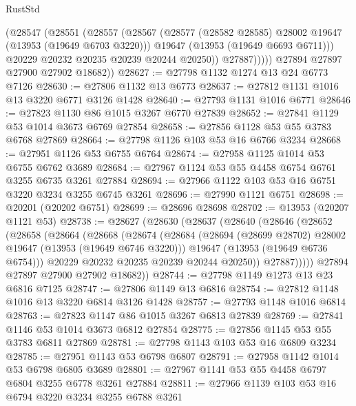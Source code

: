 \begin{lexlean}{RustStd}
\begin{coremodule}
                (@28547
                  (@28551
                    (@28557
                      (@28567
                        (@28577 (@28582 @28585) @28002 @19647 (@13953 (@19649 @6703 @3220)))
                        @19647
                        (@13953 (@19649 @6693 @6711)))
                      @20229
                      @20232
                      @20235
                      @20239
                      @20244
                      @20250))
                  @27887)))))
        @27894
        @27897
        @27900
        @27902
        @18682))
@28627 := @27798 @1132 @1274 @13 @24 @6773 @7126
@28630 := @27806 @1132 @13 @6773
@28637 := @27812 @1131 @1016 @13 @3220 @6771 @3126 @1428
@28640 := @27793 @1131 @1016 @6771
@28646 := @27823 @1130 @86 @1015 @3267 @6770 @27839
@28652 := @27841 @1129 @53 @1014 @3673 @6769 @27854
@28658 := @27856 @1128 @53 @55 @3783 @6768 @27869
@28664 := @27798 @1126 @103 @53 @16 @6766 @3234
@28668 := @27951 @1126 @53 @6755 @6764
@28674 := @27958 @1125 @1014 @53 @6755 @6762 @3689
@28684 := @27967 @1124 @53 @55 @4458 @6754 @6761 @3255 @6735 @3261 @27884
@28694 := @27966 @1122 @103 @53 @16 @6751 @3220 @3234 @3255 @6745 @3261
@28696 := @27990 @1121 @6751
@28698 := @20201 (@20202 @6751)
@28699 := @28696 @28698
@28702 := @13953 (@20207 @1121 @53)
@28738 := @28627
    (@28630
      (@28637
        (@28640
          (@28646
            (@28652
              (@28658
                (@28664
                  (@28668
                    (@28674
                      (@28684
                        (@28694 (@28699 @28702) @28002 @19647 (@13953 (@19649 @6746 @3220)))
                        @19647
                        (@13953 (@19649 @6736 @6754)))
                      @20229
                      @20232
                      @20235
                      @20239
                      @20244
                      @20250))
                  @27887)))))
        @27894
        @27897
        @27900
        @27902
        @18682))
@28744 := @27798 @1149 @1273 @13 @23 @6816 @7125
@28747 := @27806 @1149 @13 @6816
@28754 := @27812 @1148 @1016 @13 @3220 @6814 @3126 @1428
@28757 := @27793 @1148 @1016 @6814
@28763 := @27823 @1147 @86 @1015 @3267 @6813 @27839
@28769 := @27841 @1146 @53 @1014 @3673 @6812 @27854
@28775 := @27856 @1145 @53 @55 @3783 @6811 @27869
@28781 := @27798 @1143 @103 @53 @16 @6809 @3234
@28785 := @27951 @1143 @53 @6798 @6807
@28791 := @27958 @1142 @1014 @53 @6798 @6805 @3689
@28801 := @27967 @1141 @53 @55 @4458 @6797 @6804 @3255 @6778 @3261 @27884
@28811 := @27966 @1139 @103 @53 @16 @6794 @3220 @3234 @3255 @6788 @3261

\end{coremodule}
\end{lexlean}
